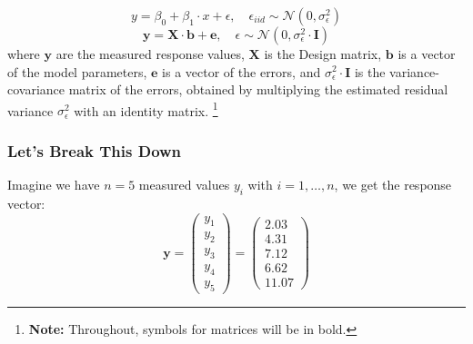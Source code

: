 \documentclass{beamer}
\begin{document}
\begin{frame}
    \frametitle{}
    \begin{equation*}
        y = \beta_0 + \beta_1 \cdot x + \epsilon, \quad \epsilon_{iid} \sim \mathcal{N}(0, \sigma^2_{\epsilon})
    \end{equation*}
    \begin{equation*}
        \mathbf{y} = \mathbf{X} \cdot \mathbf{b} + \mathbf{e}, \quad \epsilon \sim \mathcal{N}(0, \sigma^2_{\epsilon} \cdot \mathbf{I})
    \end{equation*}
    where $\mathbf{y}$ are the measured response values, $\mathbf{X}$ is the Design matrix, $\mathbf{b}$ is a vector of the model parameters, $\mathbf{e}$ is a vector of the errors, and $\sigma^2_{\epsilon} \cdot \mathbf{I}$ is the variance-covariance matrix of the errors, obtained by multiplying the estimated residual variance $\sigma^2_{\epsilon}$ with an identity matrix. \footnote{\textbf{Note:} Throughout, symbols for matrices will be in bold.}
    

\end{frame}

\begin{frame}
    \frametitle{Let's Break This Down}
    Imagine we have $n = 5$ measured values $y_i$ with $i = 1, \ldots, n$, we get the response vector:
    \vspace{0.5cm}
    \begin{equation*}
        \mathbf{y} = \left( \begin{array}{c} y_1 \\ y_2 \\ y_3 \\ y_4 \\ y_5 \end{array}\right) = \left( \begin{array}{c} 2.03 \\ 4.31 \\ 7.12 \\ 6.62 \\ 11.07 \end{array}\right) 
    \end{equation*}    
\end{frame}
\end{document}
